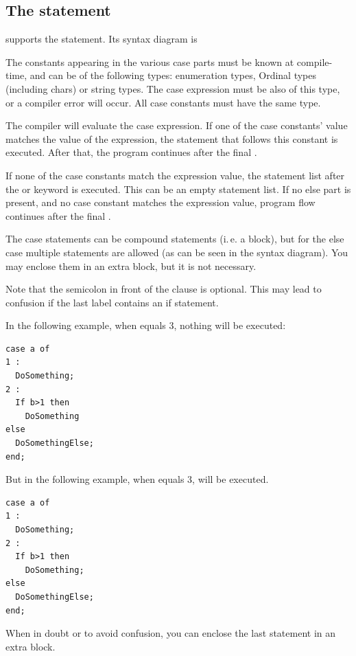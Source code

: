\subsection{The  statement}
\fpc supports the  statement. Its syntax diagram is

The constants appearing in the various case parts must be known at
compile-time, and can be of the following types: enumeration types,
Ordinal types (including chars) or string types.
The case expression must be also of this type, or a compiler error
will occur. All case constants must have the same type.

The compiler will evaluate the case expression. If one of the case
constants' value matches the value of the expression, the statement that follows
this constant is executed. After that, the program continues after the final
.  

If none of the case constants match the expression value, the statement
list after the   or 
keyword is executed. This can be an empty statement list.
If no else part is present, and no case constant matches the expression
value, program flow continues after the final .

The case statements can be compound statements (i.\,e. a 
block), but for the else case multiple statements are allowed (as can be
seen in the syntax diagram). You may enclose them in an extra 
block, but it is not necessary.

Note that the semicolon in front of the  clause is optional.
This may lead to confusion if the last label contains an if statement.

In the following example, when  equals 3, nothing will be executed:
\begin{verbatim}
case a of
1 : 
  DoSomething;
2 : 
  If b>1 then
    DoSomething
else
  DoSomethingElse;
end;
\end{verbatim}
But in the following example, when  equals 3, 
will be executed.
\begin{verbatim}
case a of
1 : 
  DoSomething;
2 : 
  If b>1 then
    DoSomething;
else
  DoSomethingElse;
end;
\end{verbatim}
When in doubt or to avoid confusion, you can enclose the last statement in an extra 
block.


